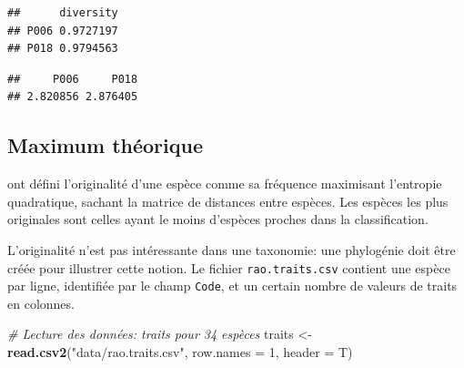 \documentclass[
  11pt,
  french,
  a4paper,
  extrafontsizes,onecolumn,openright
  ]{memoir}
\newenvironment{Shaded}{\begin{snugshade}}{\end{snugshade}}
\newcommand{\CommentTok}[1]{\textcolor[rgb]{0.56,0.35,0.01}{\textit{#1}}}
\newcommand{\DataTypeTok}[1]{\textcolor[rgb]{0.13,0.29,0.53}{#1}}
\newcommand{\DecValTok}[1]{\textcolor[rgb]{0.00,0.00,0.81}{#1}}
\newcommand{\KeywordTok}[1]{\textcolor[rgb]{0.13,0.29,0.53}{\textbf{#1}}}
\newcommand{\NormalTok}[1]{#1}
\newcommand{\OperatorTok}[1]{\textcolor[rgb]{0.81,0.36,0.00}{\textbf{#1}}}
\newcommand{\StringTok}[1]{\textcolor[rgb]{0.31,0.60,0.02}{#1}}
\begin{document}
\scriptsize

\begin{Shaded}
\end{Shaded}

\begin{verbatim}
##      diversity
## P006 0.9727197
## P018 0.9794563
\end{verbatim}

\begin{Shaded}
\end{Shaded}

\begin{verbatim}
##     P006     P018 
## 2.820856 2.876405
\end{verbatim}

\normalsize

\hypertarget{sec:MaxTheorique}{%
\subsection{Maximum théorique}\label{sec:MaxTheorique}}

\textcite{Pavoine2005a} ont défini l'originalité d'une espèce comme sa fréquence maximisant l'entropie quadratique, sachant la matrice de distances entre espèces.
Les espèces les plus originales sont celles ayant le moins d'espèces proches dans la classification.

L'originalité n'est pas intéressante dans une taxonomie: une phylogénie doit être créée pour illustrer cette notion.
Le fichier \texttt{rao.traits.csv} contient une espèce par ligne, identifiée par le champ \texttt{Code}, et un certain nombre de valeurs de traits en colonnes.

\scriptsize

\begin{Shaded}
\begin{Highlighting}[]
\CommentTok{# Lecture des données: traits pour 34 espèces}
\NormalTok{traits <-}\StringTok{ }\KeywordTok{read.csv2}\NormalTok{(}\StringTok{"data/rao.traits.csv"}\NormalTok{, }\DataTypeTok{row.names =} \DecValTok{1}\NormalTok{, }\DataTypeTok{header =}\NormalTok{ T)}
\end{Highlighting}
\end{Shaded}
\end{document}
